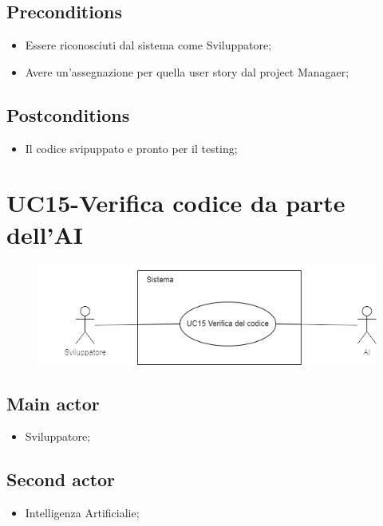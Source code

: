 \documentclass{article}
\begin{document}
    \subsection*{Preconditions}
        \begin{itemize}
            \item Essere riconosciuti dal sistema come Sviluppatore;
            \item Avere un'assegnazione per quella user story dal project Managaer;
        \end{itemize}
        
    \subsection*{Postconditions} 
        \begin{itemize}
            \item Il codice svipuppato e pronto per il testing;
        \end{itemize}
        
\section{UC15-Verifica codice da parte dell'AI}
    \begin{figure}[h]
      \centering
      \includegraphics{./imgUML/UC15.png}
      \label{fig:immagine}
    \end{figure}
    
    \subsection*{Main actor}
        \begin{itemize}
            \item Sviluppatore;
        \end{itemize}
    \subsection*{Second actor}
        \begin{itemize}
            \item Intelligenza Artificialie;
        \end{itemize}
    
\end{document}
